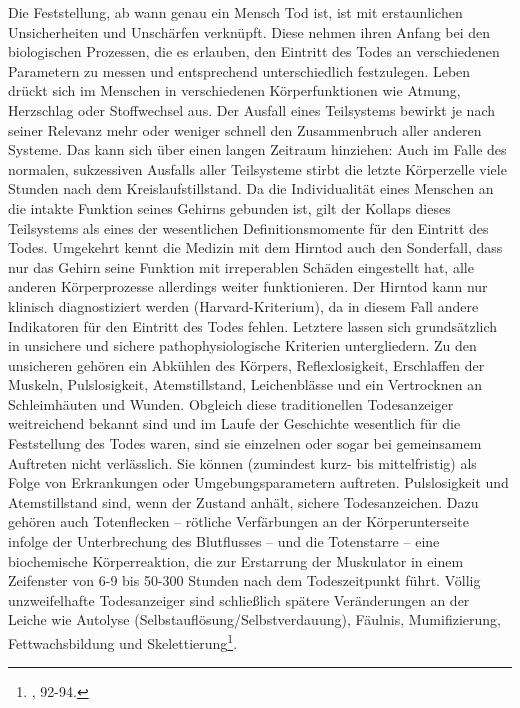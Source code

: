 \documentclass[openany,twoside,twocolumn]{book}
\let\rmarkdownfootnote\footnote%
\def\footnote{\protect\rmarkdownfootnote}
\begin{document}
Die Feststellung, ab wann genau ein Mensch Tod ist, ist mit
erstaunlichen Unsicherheiten und Unschärfen verknüpft. Diese nehmen
ihren Anfang bei den biologischen Prozessen, die es erlauben, den
Eintritt des Todes an verschiedenen Parametern zu messen und
entsprechend unterschiedlich festzulegen. Leben drückt sich im Menschen
in verschiedenen Körperfunktionen wie Atmung, Herzschlag oder
Stoffwechsel aus. Der Ausfall eines Teilsystems bewirkt je nach seiner
Relevanz mehr oder weniger schnell den Zusammenbruch aller anderen
Systeme. Das kann sich über einen langen Zeitraum hinziehen: Auch im
Falle des normalen, sukzessiven Ausfalls aller Teilsysteme stirbt die
letzte Körperzelle viele Stunden nach dem Kreislaufstillstand. Da die
Individualität eines Menschen an die intakte Funktion seines Gehirns
gebunden ist, gilt der Kollaps dieses Teilsystems als eines der
wesentlichen Definitionsmomente für den Eintritt des Todes. Umgekehrt
kennt die Medizin mit dem Hirntod auch den Sonderfall, dass nur das
Gehirn seine Funktion mit irreperablen Schäden eingestellt hat, alle
anderen Körperprozesse allerdings weiter funktionieren. Der Hirntod kann
nur klinisch diagnostiziert werden (Harvard-Kriterium), da in diesem
Fall andere Indikatoren für den Eintritt des Todes fehlen. Letztere
lassen sich grundsätzlich in unsichere und sichere pathophysiologische
Kriterien untergliedern. Zu den unsicheren gehören ein Abkühlen des
Körpers, Reflexlosigkeit, Erschlaffen der Muskeln, Pulslosigkeit,
Atemstillstand, Leichenblässe und ein Vertrocknen an Schleimhäuten und
Wunden. Obgleich diese traditionellen Todesanzeiger weitreichend bekannt
sind und im Laufe der Geschichte wesentlich für die Feststellung des
Todes waren, sind sie einzelnen oder sogar bei gemeinsamem Auftreten
nicht verlässlich. Sie können (zumindest kurz- bis mittelfristig) als
Folge von Erkrankungen oder Umgebungsparametern auftreten. Pulslosigkeit
und Atemstillstand sind, wenn der Zustand anhält, sichere
Todesanzeichen. Dazu gehören auch Totenflecken -- rötliche Verfärbungen
an der Körperunterseite infolge der Unterbrechung des Blutflusses -- und
die Totenstarre -- eine biochemische Körperreaktion, die zur Erstarrung
der Muskulator in einem Zeifenster von 6-9 bis 50-300 Stunden nach dem
Todeszeitpunkt führt. Völlig unzweifelhafte Todesanzeiger sind
schließlich spätere Veränderungen an der Leiche wie Autolyse
(Selbstauflösung/Selbstverdauung), Fäulnis, Mumifizierung,
Fettwachsbildung und Skelettierung\footnote{\textcite{hofmann_rituelle_2008},
  92-94.}.
\end{document}
